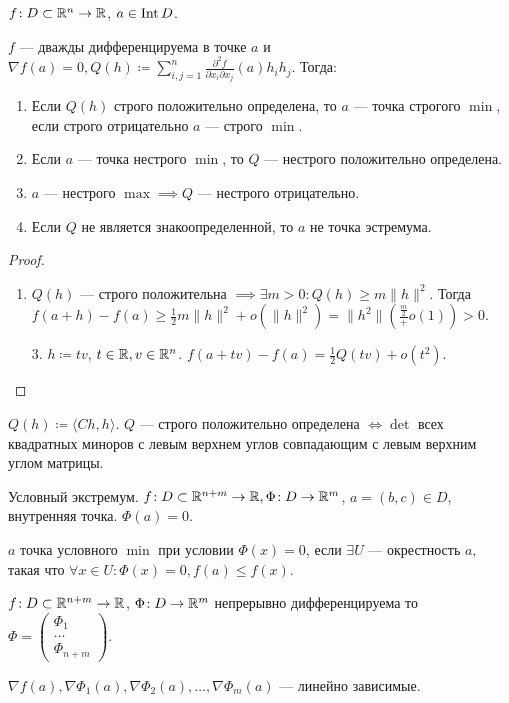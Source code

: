 \begin{theorem}
    $f\!: D \subset \mathbb{R}^n \to \mathbb{R}$,  $a \in \operatorname{Int} D$.

    $f$ --- дважды дифференцируема в точке  $a$ и  $\nabla f(a) = 0, Q(h) \coloneqq \sum\limits_{i, j = 1}^n \frac{\partial^2 f}{\partial x_i \partial x_j}(a) h_ih_j$. Тогда:
    \begin{enumerate}
        \item Если  $Q(h)$ строго положительно определена, то  $a$ --- точка строгого  $\min$, если строго отрицательно $a$ --- строго  $\min$.
        \item Если  $a$ --- точка нестрого  $\min$, то  $Q$ --- нестрого положительно определена.
        \item  $a$ --- нестрого  $\max \implies Q$ --- нестрого отрицательно.
        \item Если  $Q$ не является знакоопределенной, то  $a$ не точка эстремума.
    \end{enumerate}
\end{theorem}
\begin{proof}
    \begin{enumerate}
        \item $Q(h)$ --- строго положительна  $\implies \exists m > 0\!: Q(h) \ge m \|h\|^2$. Тогда $f(a+h) - f(a) \ge \frac{1}{2}m \|h\|^2 + o(\|h\|^2) = \|h^2\|(\frac{\frac{m}{2}} + o(1)) > 0$.
        \item[3. ] $h \coloneqq tv$,  $t \in \mathbb{R}, v \in \mathbb{R}^n$.  $f(a+tv) - f(a) = \frac{1}{2}Q(tv) + o(t^2)$.
    \end{enumerate}
\end{proof}
\begin{theorem}
    $Q(h) \coloneqq \langle Ch, h\rangle$.  $Q$ --- строго положительно определена  $\iff \det$ всех квадратных миноров с левым верхнем углов совпадающим с левым верхним углом матрицы.
\end{theorem}
\begin{definition}
    Условный экстремум. $f\!: D \subset \mathbb{R}^{n+m} \to \mathbb{R}, \Phi\!: D \to \mathbb{R}^m$,  $a = (b, c) \in D$, внутренняя точка.  $\Phi(a) = 0$.

     $a$ точка условного  $\min$ при условии  $\Phi(x) = 0$, если  $\exists U$ --- окрестность  $a$, такая что  $\forall x \in U\!: \Phi(x) = 0, f(a) \le f(x)$.
\end{definition}
\begin{statement}
    $f\!: D\subset \mathbb{R}^{n+m} \to \mathbb{R}$,  $\Phi\!: D \to \mathbb{R}^m$ непрерывно дифференцируема то $\Phi = \begin{pmatrix} \Phi_1 \\ \ldots \\ \Phi_{n+m} \end{pmatrix}$.

    $\nabla f(a), \nabla \Phi_1(a), \nabla \Phi_2(a), \ldots, \nabla \Phi_m(a)$ --- линейно зависимые.
\end{statement}
